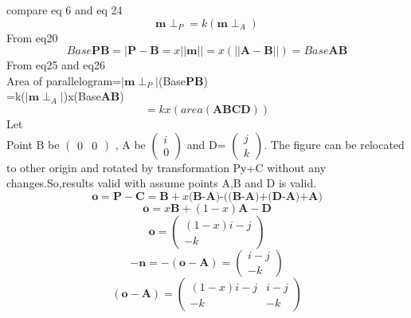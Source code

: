 \documentclass[journal,10pt,twocolumn]{article}
\begin{document}
compare eq 6 and eq 24
\begin{equation}
\boldsymbol{m} \perp_P=k(\boldsymbol{m} \perp_A)
\end{equation}
From eq20
\begin{equation}
	Base\textbf{PB}=|\boldsymbol{P}-\boldsymbol{B}=x||\boldsymbol{m}||=x(||\boldsymbol{A}-\boldsymbol{B}||)=Base\textbf{AB}
\end{equation}
From eq25 and eq26\\
Area of parallelogram=$|\boldsymbol{m}\perp_P|$(Base\textbf{PB})\\
=k($|\boldsymbol{m}\perp_A|$)x(Base\textbf{AB})
\begin{equation}
	=kx(area(\textbf{ABCD}))
\end{equation}
Let\\
Point B be
$\begin{pmatrix}
    0&0
\end{pmatrix}$
, A be 
$\begin{pmatrix}
    i \\
    0
\end{pmatrix}$
and D=
$\begin{pmatrix}
    j\\
    k
\end{pmatrix}$.
The figure can be relocated to other origin and rotated by transformation Py+C without any changes.So,results valid with assume points A,B and D is valid.
\begin{equation}
	\boldsymbol{o}=\boldsymbol{P}-\boldsymbol{C}=\boldsymbol{B}+x\textbf{(B-A)-((B-A)+(D-A)+A)}
\end{equation}
\begin{equation}
    \boldsymbol{o}=x\boldsymbol{B}+(1-x)\boldsymbol{A}-\boldsymbol{D}
\end{equation}
\begin{equation}
    \boldsymbol{o}=
    \begin{pmatrix}
        (1-x)i-j\\
        -k
    \end{pmatrix}
\end{equation}
\begin{equation}
    -\boldsymbol{n}=-(\boldsymbol{o}-\boldsymbol{A})=
    \begin{pmatrix}
        i-j\\
        -k
    \end{pmatrix}
\end{equation}
\begin{equation}
    (\boldsymbol{o}-\boldsymbol{A})=
    \begin{pmatrix}
        (1-x)i-j & i-j \\
        -k       & -k
    \end{pmatrix}
\end{equation}
\end{document}
